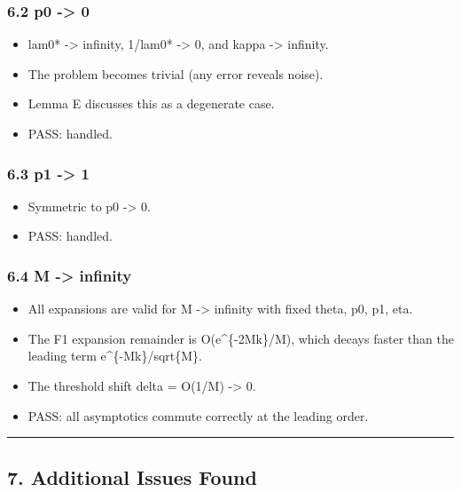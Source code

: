 \documentclass[
  12pt,
]{article}
\providecommand{\tightlist}{%
  \setlength{\itemsep}{0pt}\setlength{\parskip}{0pt}}
\begin{document}
\subsubsection{6.2 p0 -\textgreater{} 0}\label{p0---0}

\begin{itemize}
\tightlist
\item
  lam0* -\textgreater{} infinity, 1/lam0* -\textgreater{} 0, and kappa
  -\textgreater{} infinity.
\item
  The problem becomes trivial (any error reveals noise).
\item
  Lemma E discusses this as a degenerate case.
\item
  PASS: handled.
\end{itemize}

\subsubsection{6.3 p1 -\textgreater{} 1}\label{p1---1}

\begin{itemize}
\tightlist
\item
  Symmetric to p0 -\textgreater{} 0.
\item
  PASS: handled.
\end{itemize}

\subsubsection{6.4 M -\textgreater{} infinity}\label{m---infinity}

\begin{itemize}
\tightlist
\item
  All expansions are valid for M -\textgreater{} infinity with fixed
  theta, p0, p1, eta.
\item
  The F1 expansion remainder is O(e\^{}\{-2Mk\}/M), which decays faster
  than the leading term e\^{}\{-Mk\}/sqrt\{M\}.
\item
  The threshold shift delta = O(1/M) -\textgreater{} 0.
\item
  PASS: all asymptotics commute correctly at the leading order.
\end{itemize}

\begin{center}\rule{0.5\linewidth}{0.5pt}\end{center}

\subsection{7. Additional Issues Found}\label{additional-issues-found}
\end{document}
